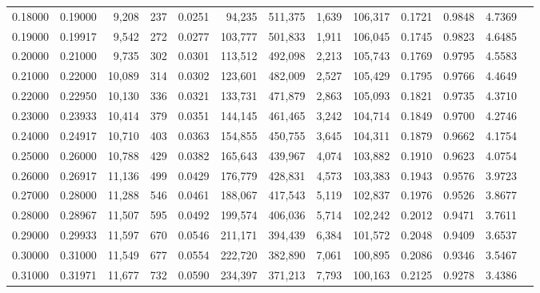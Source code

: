 \begin{tabular}{rrrrrrrrrrrrr}
0.18000 & 0.19000 &  9,208 &   237 &                                     0.0251 &  94,235 & 511,375 &   1,639 & 106,317 & 0.1721 & 0.9848 & 4.7369 \\
0.19000 & 0.19917 &  9,542 &   272 &                                     0.0277 & 103,777 & 501,833 &   1,911 & 106,045 & 0.1745 & 0.9823 & 4.6485 \\
0.20000 & 0.21000 &  9,735 &   302 &                                     0.0301 & 113,512 & 492,098 &   2,213 & 105,743 & 0.1769 & 0.9795 & 4.5583 \\
0.21000 & 0.22000 & 10,089 &   314 &                                     0.0302 & 123,601 & 482,009 &   2,527 & 105,429 & 0.1795 & 0.9766 & 4.4649 \\
0.22000 & 0.22950 & 10,130 &   336 &                                     0.0321 & 133,731 & 471,879 &   2,863 & 105,093 & 0.1821 & 0.9735 & 4.3710 \\
0.23000 & 0.23933 & 10,414 &   379 &                                     0.0351 & 144,145 & 461,465 &   3,242 & 104,714 & 0.1849 & 0.9700 & 4.2746 \\
0.24000 & 0.24917 & 10,710 &   403 &                                     0.0363 & 154,855 & 450,755 &   3,645 & 104,311 & 0.1879 & 0.9662 & 4.1754 \\
0.25000 & 0.26000 & 10,788 &   429 &                                     0.0382 & 165,643 & 439,967 &   4,074 & 103,882 & 0.1910 & 0.9623 & 4.0754 \\
0.26000 & 0.26917 & 11,136 &   499 &                                     0.0429 & 176,779 & 428,831 &   4,573 & 103,383 & 0.1943 & 0.9576 & 3.9723 \\
0.27000 & 0.28000 & 11,288 &   546 &                                     0.0461 & 188,067 & 417,543 &   5,119 & 102,837 & 0.1976 & 0.9526 & 3.8677 \\
0.28000 & 0.28967 & 11,507 &   595 &                                     0.0492 & 199,574 & 406,036 &   5,714 & 102,242 & 0.2012 & 0.9471 & 3.7611 \\
0.29000 & 0.29933 & 11,597 &   670 &                                     0.0546 & 211,171 & 394,439 &   6,384 & 101,572 & 0.2048 & 0.9409 & 3.6537 \\
0.30000 & 0.31000 & 11,549 &   677 &                                     0.0554 & 222,720 & 382,890 &   7,061 & 100,895 & 0.2086 & 0.9346 & 3.5467 \\
0.31000 & 0.31971 & 11,677 &   732 &                                     0.0590 & 234,397 & 371,213 &   7,793 & 100,163 & 0.2125 & 0.9278 & 3.4386 \\

\end{tabular}
